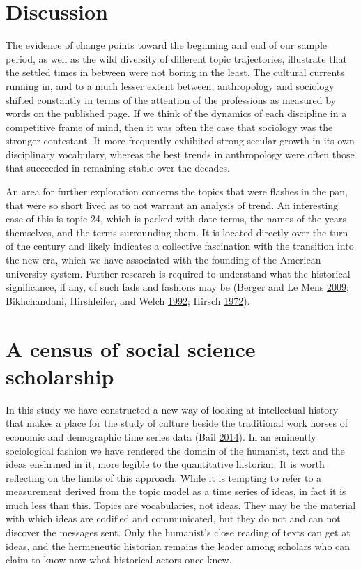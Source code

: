 \documentclass[]{book}
\theoremstyle{definition}
\theoremstyle{definition}
\theoremstyle{definition}
\theoremstyle{remark}
\begin{document}
\hypertarget{discussion-2}{%
\section{\texorpdfstring{ Discussion}{ Discussion}}\label{discussion-2}}

The evidence of change points toward the beginning and end of our sample
period, as well as the wild diversity of different topic trajectories,
illustrate that the settled times in between were not boring in the
least. The cultural currents running in, and to a much lesser extent
between, anthropology and sociology shifted constantly in terms of the
attention of the professions as measured by words on the published page.
If we think of the dynamics of each discipline in a competitive frame of
mind, then it was often the case that sociology was the stronger
contestant. It more frequently exhibited strong secular growth in its
own disciplinary vocabulary, whereas the best trends in anthropology
were often those that succeeded in remaining stable over the decades.

An area for further exploration concerns the topics that were flashes in
the pan, that were so short lived as to not warrant an analysis of
trend. An interesting case of this is topic 24, which is packed with
date terms, the names of the years themselves, and the terms surrounding
them. It is located directly over the turn of the century and likely
indicates a collective fascination with the transition into the new era,
which we have associated with the founding of the American university
system. Further research is required to understand what the historical
significance, if any, of such fads and fashions may be (Berger and Le
Mens \protect\hyperlink{ref-Berger2009How}{2009}; Bikhchandani,
Hirshleifer, and Welch
\protect\hyperlink{ref-Bikhchandani1992Theory}{1992}; Hirsch
\protect\hyperlink{ref-Hirsch1972Processing}{1972}).

\hypertarget{a-census-of-social-science-scholarship}{%
\section{A census of social science
scholarship}\label{a-census-of-social-science-scholarship}}

In this study we have constructed a new way of looking at intellectual
history that makes a place for the study of culture beside the
traditional work horses of economic and demographic time series data
(Bail \protect\hyperlink{ref-Bail2014cultural}{2014}). In an eminently
sociological fashion we have rendered the domain of the humanist, text
and the ideas enshrined in it, more legible to the quantitative
historian. It is worth reflecting on the limits of this approach. While
it is tempting to refer to a measurement derived from the topic model as
a time series of ideas, in fact it is much less than this. Topics are
vocabularies, not ideas. They may be the material with which ideas are
codified and communicated, but they do not and can not discover the
messages sent. Only the humanist's close reading of texts can get at
ideas, and the hermeneutic historian remains the leader among scholars
who can claim to know now what historical actors once knew.
\end{document}
